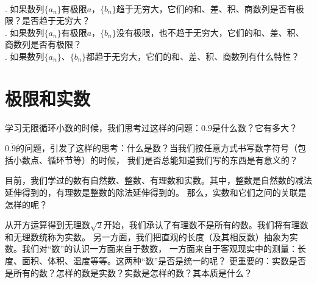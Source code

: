 \documentclass[12pt,UTF8]{ctexbook}
\begin{document}
\begin{sk}
    \mbox{} \\
    . 如果数列$\{a_n\}$有极限$a$，$\{b_n\}$趋于无穷大，它们的和、差、积、商数列是否有极限？是否趋于无穷大？\\
    . 如果数列$\{a_n\}$有极限$a$，$\{b_n\}$没有极限，也不趋于无穷大，它们的和、差、积、商数列是否有极限？\\
    . 如果数列$\{a_n\}$、$\{b_n\}$都趋于无穷大，它们的和、差、积、商数列有什么特性？
\end{sk}

\section{极限和实数}
\begin{center}
\end{center}

学习无限循环小数的时候，我们思考过这样的问题：$0.\dot{9}$是什么数？它有多大？

$0.\dot{9}$的问题，引发了这样的思考：什么是数？当我们按任意方式书写数字符号（包括小数点、循环节等）的时候，
我们是否总能知道我们写的东西是有意义的？

目前，我们学过的数有自然数、整数、有理数和实数。其中，整数是自然数的减法延伸得到的，有理数是整数的除法延伸得到的。
那么，实数和它们之间的关联是怎样的呢？

从开方运算得到无理数$\sqrt{2}$开始，我们承认了有理数不是所有的数。我们将有理数和无理数统称为实数。
另一方面，我们把直观的长度（及其相反数）抽象为实数。我们对“数”的认识一方面来自于数数，
一方面来自于客观现实中的测量：长度、面积、体积、温度等等。这两种“数”是否是统一的呢？
更重要的：实数是否是所有的数？怎样的数是实数？实数是怎样的数？其本质是什么？
\end{document}
